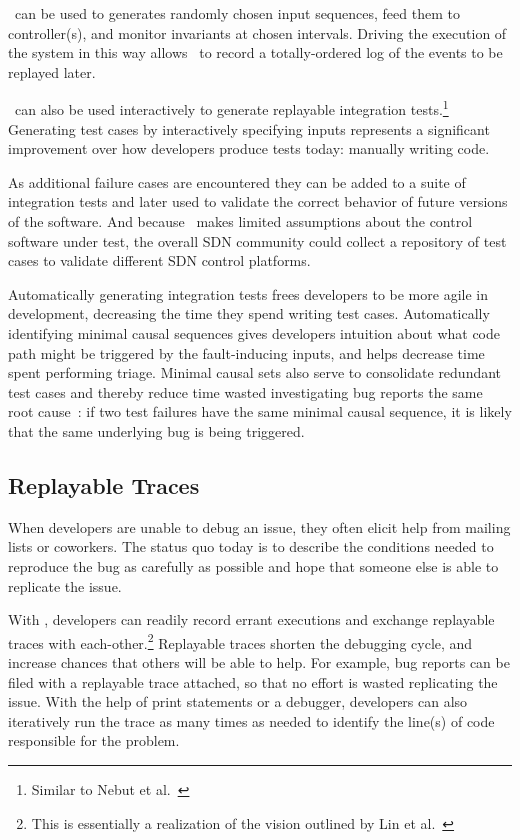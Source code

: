 \projectname~can be used to generates randomly chosen input
sequences, feed them to controller(s), and monitor invariants at chosen
intervals. Driving the
execution of the system in this way allows \projectname~to record a
totally-ordered log of the events to be replayed later.

\projectname~can also be used interactively to generate replayable integration
tests.\footnote{Similar to Nebut et al.~\cite{automated_tests}} Generating test cases by
interactively specifying inputs represents a
significant improvement over how developers produce tests today: manually writing
code.

As additional failure cases are encountered they can be added
to a suite of integration tests and later used to validate the correct
behavior of future versions of the software. And because \projectname~makes
limited assumptions about the control software under test, the overall SDN community
could collect a repository of test cases to validate different SDN control platforms.

Automatically generating integration tests frees developers to be more agile in
development, decreasing the time they spend writing test cases.
Automatically identifying minimal causal sequences gives developers
intuition about what code path might be triggered by the fault-inducing
inputs, and helps decrease time spent performing triage.
Minimal causal sets also serve to consolidate redundant test cases
and thereby reduce time wasted
investigating bug reports the same root
cause~\cite{Zeller:2002:SIF:506201.506206}:
if two test failures have the same minimal causal sequence, it is
likely that the same underlying bug is being triggered.

\subsection{Replayable Traces}

When developers are unable to debug an issue, they often elicit help from
mailing lists or coworkers. The status quo today is to describe the conditions needed to
reproduce the bug as carefully as possible and hope that someone else is able
to replicate the issue.

With \projectname, developers can readily record errant executions and
exchange replayable traces with each-other.\footnote{This is essentially a
realization of the vision outlined by Lin et al.~\cite{lin2009towards}} Replayable traces shorten the debugging cycle, and increase chances that others
will be able to help. For example, bug reports can be filed with a replayable trace
attached, so that no
effort is wasted replicating the issue. With the help of print statements or a
debugger, developers can also iteratively run the trace as many times as
needed to identify the line(s) of code responsible for the problem.

